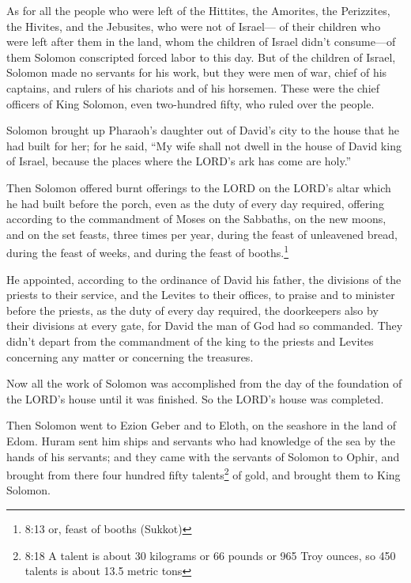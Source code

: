 \myverse{}As for all the people who were left of the Hittites, the Amorites,
the Perizzites, the Hivites, and the Jebusites, who were not of Israel—
\myverse{}of their children who were left after them in the land, whom the children of
Israel didn’t consume—of them Solomon conscripted forced labor to this day.
\myverse{}But of the children of Israel, Solomon made no servants for his work, but they
were men of war, chief of his captains, and rulers of his chariots and of his horsemen.
\myverse{}These were the chief officers of King Solomon, even two-hundred fifty, who
ruled over the people.

\myverse{}Solomon brought up Pharaoh’s daughter out of David’s city to
the house that he had built for her; for he said, “My wife shall not dwell in the house of David king
of Israel, because the places where the LORD’s ark has come are holy.”

\myverse{}Then Solomon offered burnt offerings to the LORD on the LORD’s
altar which he had built before the porch,
\myverse{}even as the duty of every day required, offering according to the commandment
of Moses on the Sabbaths, on the new moons, and on the set feasts, three times per year, during the feast
of unleavened bread, during the feast of weeks, and during the feast of booths.\footnote{8:13 or, feast of booths (Sukkot)}

\myverse{}He appointed, according to the ordinance of David his father,
the divisions of the priests to their service, and the Levites to their offices, to praise and to minister
before the priests, as the duty of every day required, the doorkeepers also by their divisions at every
gate, for David the man of God had so commanded.
\myverse{}They didn’t depart from the commandment of the king to the priests and Levites
concerning any matter or concerning the treasures.

\myverse{}Now all the work of Solomon was accomplished from the day of
the foundation of the LORD’s house until it was finished. So the LORD’s house was completed.

\myverse{}Then Solomon went to Ezion Geber and to Eloth, on the seashore
in the land of Edom.
\myverse{}Huram sent him ships and servants who had knowledge of the sea by the hands
of his servants; and they came with the servants of Solomon to Ophir, and brought from there four hundred
fifty talents\footnote{8:18 A talent is about 30 kilograms or 66 pounds or 965 Troy ounces, so 450 talents is about 13.5
	metric tons} of gold, and brought them to King Solomon.


